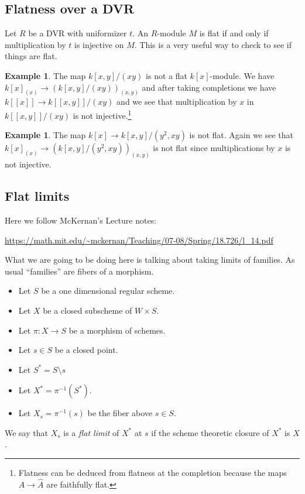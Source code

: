 \documentclass[12pt]{article}
\numberwithin{equation}{section}
\theoremstyle{definition}
\newtheorem{example}[theorem]{Example}
\theoremstyle{remark}
\begin{document}
\subsection{Flatness over a DVR}
Let $R$ be a DVR with uniformizer $t$.
An $R$-module $M$ is flat if and only if multiplication by $t$ is injective on $M$. 
This is a very useful way to check to see if things are flat.

\begin{example}
	The map $k[x,y]/(xy)$ is not a flat $k[x]$-module. 
	We have $k[x]_{(x)} \to (k[x,y]/(xy))_{(x,y)}$ and after taking completions we have $k[[x]] \to k[[x,y]]/(xy)$ and we see that multiplication by $x$ in $k[[x,y]]/(xy)$ is not injective.\footnote{Flatness can be deduced from flatness at the completion because the maps $A \to \widehat{A}$ are faithfully flat.}
\end{example}

\begin{example}
	The map $k[x] \to k[x,y]/(y^2,xy)$ is not flat. 
	Again we see that $k[x]_{(x)} \to (k[x,y]/(y^2,xy))_{(x,y)}$ is not flat since multiplications by $x$ is not injective. 
\end{example}


\subsection{Flat limits}
Here we follow McKernan's Lecture notes:
\begin{center}
	\url{https://math.mit.edu/~mckernan/Teaching/07-08/Spring/18.726/l_14.pdf}
\end{center}
What we are going to be doing here is talking about taking limits of families. 
As usual ``families'' are fibers of a morphism.

\begin{itemize}
	\item Let $S$ be a one dimensional regular scheme.
	\item Let $X$ be a closed subscheme of $W\times S$. 
	\item Let $\pi:X\to S$ be a morphism of schemes.
	\item Let $s\in S$ be a closed point. 
	\item Let $S^* = S \setminus  s$
	\item Let $X^* = \pi^{-1}(S^*)$.
	\item Let $X_s=\pi^{-1}(s)$ be the fiber above $s\in S$. 
\end{itemize}
We say that $X_s$ is a \emph{flat limit} of $X^*$ at $s$ if the scheme theoretic closure of $X^*$ is $X$. 
\end{document}
